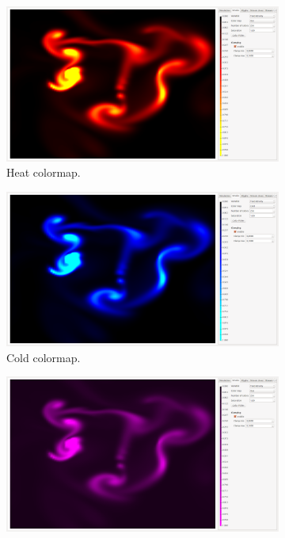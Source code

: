 \begin{figure}
\begin{subfigure}{0.44\textwidth}
		\includegraphics[width=\textwidth, trim={35px 30px 430px 30px}, clip]{colormapping/img/heat.png}
		\caption{Heat colormap.}
		\label{fig:colormapping:intro:differntColorMaps:heat}
	\end{subfigure}
	\begin{subfigure}{0.44\textwidth}
		\centering
		\includegraphics[width=\textwidth, trim={35px 30px 430px 30px}, clip]{colormapping/img/cold.png}
		\caption{Cold colormap.}
		\label{fig:colormapping:intro:differntColorMaps:cold}
	\end{subfigure}
		\begin{subfigure}{0.44\textwidth}
		\centering
		\includegraphics[width=\textwidth, trim={35px 30px 430px 30px}, clip]{colormapping/img/hue.png}

\end{subfigure}
\end{figure}
